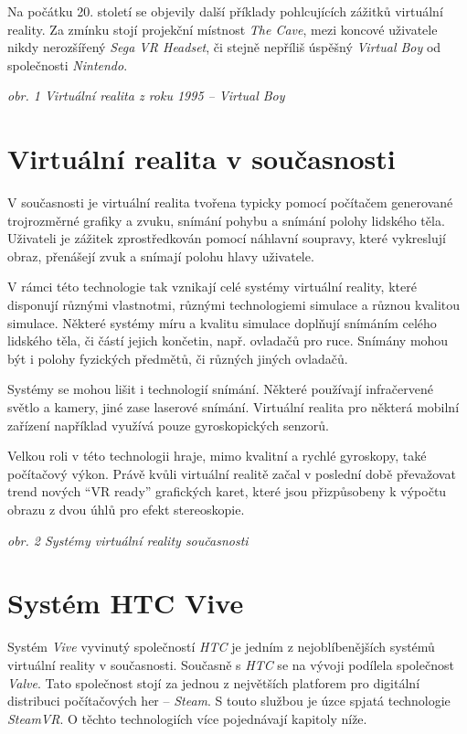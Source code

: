 Na počátku 20. století se objevily další příklady pohlcujících zážitků
virtuální reality. Za zmínku stojí projekční místnost \emph{The Cave},
mezi koncové uživatele nikdy nerozšířený \emph{Sega VR Headset}, či
stejně nepříliš úspěšný \emph{Virtual Boy} od společnosti
\emph{Nintendo}.


\emph{obr. 1 Virtuální realita z roku 1995 -- Virtual Boy}

\section{Virtuální realita v
současnosti}\label{virtuuxe1lnuxed-realita-v-souux10dasnosti}

V současnosti je virtuální realita tvořena typicky pomocí počítačem
generované trojrozměrné grafiky a zvuku, snímání pohybu a snímání polohy
lidského těla. Uživateli je zážitek zprostředkován pomocí náhlavní
soupravy, které vykreslují obraz, přenášejí zvuk a snímají polohu hlavy
uživatele. \autocite{vrnow}

V rámci této technologie tak vznikají celé systémy virtuální reality,
které disponují různými vlastnotmi, různými technologiemi simulace a
různou kvalitou simulace. Některé systémy míru a kvalitu simulace
doplňují snímáním celého lidského těla, či částí jejich končetin, např.
ovladačů pro ruce. Snímány mohou být i polohy fyzických předmětů, či
různých jiných ovladačů. 

Systémy se mohou lišit i technologií snímání.
Některé používají infračervené světlo a kamery, jiné zase laserové
snímání. Virtuální realita pro některá mobilní zařízení například
využívá pouze gyroskopických senzorů.

Velkou roli v této technologii hraje, mimo kvalitní a rychlé gyroskopy,
také počítačový výkon. \autocite{vrtech} Právě kvůli virtuální realitě začal v poslední
době převažovat trend nových ``VR ready'' grafických karet, které jsou
přizpůsobeny k výpočtu obrazu z dvou úhlů pro efekt stereoskopie.


\emph{obr. 2 Systémy virtuální reality současnosti}

\section{Systém HTC Vive}\label{systuxe9m-htc-vive}

Systém \emph{Vive} vyvinutý společností \emph{HTC} je jedním z
nejoblíbenějších systémů virtuální reality v současnosti. \autocite{vivepopular} Současně s
\emph{HTC} se na vývoji podílela společnost \emph{Valve}. Tato
společnost stojí za jednou z největších platforem pro digitální
distribuci počítačových her -- \emph{Steam}. S touto službou je úzce
spjatá technologie \emph{SteamVR}. O těchto technologiích více
pojednávají kapitoly níže.

